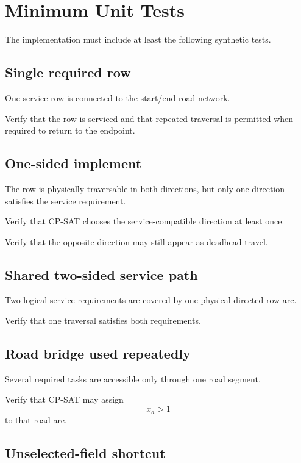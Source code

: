 \documentclass{article}
\begin{document}
\section{Minimum Unit Tests}

The implementation must include at least the following synthetic tests.

\subsection{Single required row}

One service row is connected to the start/end road network.

Verify that the row is serviced and that repeated traversal is permitted when required to return to the endpoint.

\subsection{One-sided implement}

The row is physically traversable in both directions, but only one direction satisfies the service requirement.

Verify that CP-SAT chooses the service-compatible direction at least once.

Verify that the opposite direction may still appear as deadhead travel.

\subsection{Shared two-sided service path}

Two logical service requirements are covered by one physical directed row arc.

Verify that one traversal satisfies both requirements.

\subsection{Road bridge used repeatedly}

Several required tasks are accessible only through one road segment.

Verify that CP-SAT may assign
$$
x_a>1
$$
to that road arc.

\subsection{Unselected-field shortcut}
\end{document}
